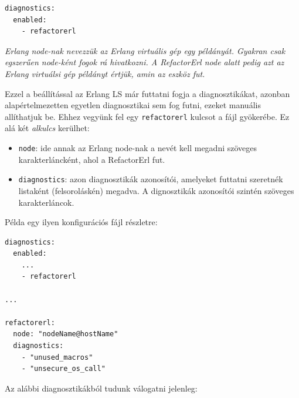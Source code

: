 \begin{lstlisting}
diagnostics:
  enabled:
    - refactorerl
\end{lstlisting}

\textit{Erlang node-nak nevezzük az Erlang virtuális gép egy példányát. Gyakran csak egszerűen node-ként fogok rá hivatkozni. A RefactorErl node alatt pedig azt az Erlang virtuálsi gép példányt értjük, amin az eszköz fut.}

Ezzel a beállítással az Erlang LS már futtatni fogja a diagnosztikákat, azonban alapértelmezetten egyetlen diagnosztikai sem fog futni, ezeket manuális allíthatjuk be. Ehhez vegyünk fel egy \lstinline{refactorerl} kulcsot a fájl gyökerébe. Ez alá két \textit{alkulcs} kerülhet:
\begin{itemize}
    \item \lstinline{node}: ide annak az Erlang node-nak a nevét kell megadni szöveges karakterláncként, ahol a RefactorErl fut. 
    \item \lstinline{diagnostics}: azon diagnosztikák azonosítói, amelyeket futtatni szeretnék listaként (felsoroláskén) megadva. A dignosztikák azonosítói szintén szöveges karakterláncok.
\end{itemize}

Példa egy ilyen konfigurációs fájl részletre:

\begin{lstlisting}
diagnostics:
  enabled:
    ...
    - refactorerl

...

refactorerl:
  node: "nodeName@hostName" 		
  diagnostics:
    - "unused_macros"			
    - "unsecure_os_call"
\end{lstlisting}

Az alábbi diagnosztikákból tudunk válogatni jelenleg:


